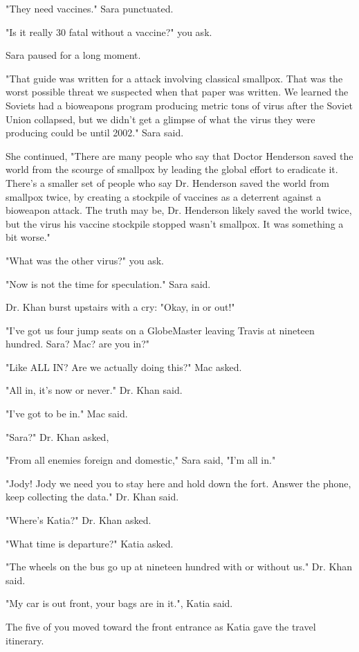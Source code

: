 \documentclass[a5paper, symmetric]{tufte-book}
\newcommand*{\smallpercent}{\textsmaller[2]{\char"25} }
\begin{document}
"They need vaccines." Sara punctuated.

"Is it really 30\smallpercent fatal without a vaccine?" you ask.

Sara paused for a long moment.

"That guide was written for a attack involving classical smallpox. That was the worst possible threat we suspected when that paper was written. We learned the Soviets had a bioweapons program producing metric tons of virus after the Soviet Union collapsed, but we didn't get a glimpse of what the virus they were producing could be until 2002." Sara said. 

She continued, "There are many people who say that Doctor Henderson saved the world from the scourge of smallpox by leading the global effort to eradicate it. There's a smaller set of people who say Dr. Henderson saved the world from smallpox twice, by creating a stockpile of vaccines as a deterrent against a bioweapon attack. The truth may be, Dr. Henderson likely saved the world twice, but the virus his vaccine stockpile stopped wasn't smallpox. It was something a bit worse."

"What was the other virus?" you ask. 

"Now is not the time for speculation." Sara said. 

Dr. Khan burst upstairs with a cry: "Okay, in or out!" 

"I've got us four jump seats on a GlobeMaster leaving Travis at nineteen hundred. Sara? Mac? are you in?" 

"Like ALL IN? Are we actually doing this?" Mac asked. 

"All in, it's now or never." Dr. Khan said. 

"I've got to be in." Mac said. 

"Sara?" Dr. Khan asked,

"From all enemies foreign and domestic," Sara said, "I'm all in." 

"Jody! Jody we need you to stay here and hold down the fort. Answer the phone, keep collecting the data." Dr. Khan said. 

"Where's Katia?" Dr. Khan asked. 

"What time is departure?" Katia asked. 

"The wheels on the bus go up at nineteen hundred with or without us." Dr. Khan said. 

"My car is out front, your bags are in it.", Katia said.  

The five of you moved toward the front entrance as Katia gave the travel itinerary. 
\end{document}
